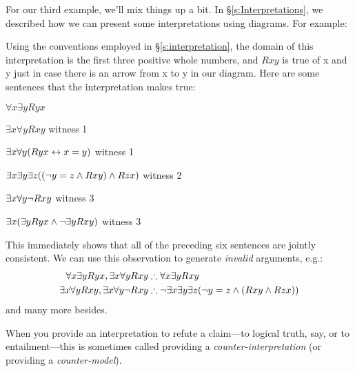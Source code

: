 For our third example, we'll mix things up a bit. In \S\ref{s:Interpretations}, we described how we can present some interpretations using diagrams. For example:
\begin{center}
\end{center}
Using the conventions employed in \S\ref{s:interpretation}, the domain of this interpretation is the first three positive whole numbers, and $Rxy$ is true of x and y just in case there is an arrow from x to y in our diagram. Here are some sentences that the interpretation makes true:
	\begin{ebullet}
		\item $\forall x \exists y Ryx$
		\item $\exists x \forall y Rxy$ \hfill witness 1
		\item $\exists x \forall y (Ryx \leftrightarrow x = y)$ \hfill witness 1
		\item $\exists x \exists y \exists z ((\neg y = z \mathbin{\wedge} Rxy) \mathbin{\wedge} Rzx)$ \hfill witness 2
		\item $\exists x \forall y \neg Rxy$ \hfill witness 3
		\item $\exists x (\exists y Ryx \mathbin{\wedge} \neg \exists y Rxy)$ \hfill witness 3
	\end{ebullet}
This immediately shows that all of the preceding six sentences are jointly consistent. We can use this observation to generate \emph{invalid} arguments, e.g.:
	\begin{align*}
		\forall x \exists y Ryx, \exists x \forall y Rxy  &\therefore  \forall x \exists y Rxy\\
		\exists x \forall y Rxy, \exists x \forall y \enot Rxy & \therefore \enot \exists x \exists y \exists z (\enot y = z \eand (Rxy \eand Rzx))
	\end{align*}
and many more besides.

When you provide an interpretation to refute a claim---to logical truth, say, or to entailment---this is sometimes called providing a \emph{counter-interpretation} (or providing a \emph{counter-model}).

